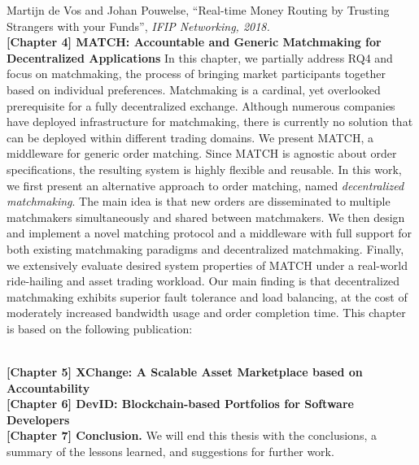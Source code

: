 Martijn de Vos and Johan Pouwelse, \enquote{Real-time Money Routing by Trusting Strangers with your Funds}, \emph{IFIP Networking, 2018.}\\

\textbf{[Chapter 4] MATCH: Accountable and Generic Matchmaking for Decentralized Applications}
In this chapter, we partially address RQ4 and focus on matchmaking, the process of bringing market participants together based on individual preferences.
Matchmaking is a cardinal, yet overlooked prerequisite for a fully decentralized exchange.
Although numerous companies have deployed infrastructure for matchmaking, there is currently no solution that can be deployed within different trading domains.
We present MATCH, a middleware for generic order matching.
Since MATCH is agnostic about order specifications, the resulting system is highly flexible and reusable.
In this work, we first present an alternative approach to order matching, named \emph{decentralized matchmaking}.
The main idea is that new orders are disseminated to multiple matchmakers simultaneously and shared between matchmakers.
We then design and implement a novel matching protocol and a middleware with full support for both existing matchmaking paradigms and decentralized matchmaking.
Finally, we extensively evaluate desired system properties of MATCH under a real-world ride-hailing and asset trading workload.
Our main finding is that decentralized matchmaking exhibits superior fault tolerance and load balancing, at the cost of moderately increased bandwidth usage and order completion time.
This chapter is based on the following publication:

\\

\textbf{[Chapter 5] XChange: A Scalable Asset Marketplace based on Accountability}\\

\textbf{[Chapter 6] DevID: Blockchain-based Portfolios for Software Developers}\\

\textbf{[Chapter 7] Conclusion.} We will end this thesis with the conclusions, a summary of the lessons learned, and suggestions for further work.
